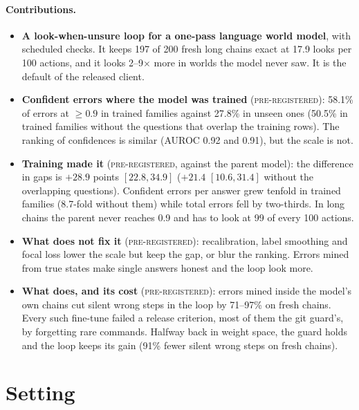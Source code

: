 \documentclass[11pt]{article}
\newcommand{\prereg}{\textsc{pre-registered}}
\begin{document}
\paragraph{Contributions.}
\begin{itemize}
  \item \textbf{A look-when-unsure loop for a one-pass language world model}, with scheduled checks. It keeps 197 of 200
  fresh long chains exact at 17.9 looks per 100 actions, and it looks 2--9$\times$ more in worlds the model never saw.
  It is the default of the released client.
  \item \textbf{Confident errors where the model was trained} (\prereg): 58.1\% of errors at $\ge 0.9$ in trained
  families against 27.8\% in unseen ones (50.5\% in trained families without the questions that overlap the training
  rows). The ranking of confidences is similar (AUROC 0.92 and 0.91), but the scale is not.
  \item \textbf{Training made it} (\prereg, against the parent model): the difference in gaps is $+28.9$ points
  $[22.8, 34.9]$ ($+21.4$ $[10.6, 31.4]$ without the overlapping questions). Confident errors per answer grew tenfold
  in trained families (8.7-fold without them) while total errors fell by two-thirds.
  In long chains the parent never reaches 0.9 and has to look at 99 of every 100 actions.
  \item \textbf{What does not fix it} (\prereg): recalibration, label smoothing and focal loss lower the scale but keep
  the gap, or blur the ranking. Errors mined from true states make single answers honest and the loop look more.
  \item \textbf{What does, and its cost} (\prereg): errors mined inside the model's own chains cut silent wrong steps
  in the loop by 71--97\% on fresh chains. Every such fine-tune failed a release criterion, most of them the git guard's,
  by forgetting rare commands. Halfway back in weight space, the guard holds and the loop keeps its gain (91\% fewer
  silent wrong steps on fresh chains).
\end{itemize}

\section{Setting}\label{sec:setting}
\end{document}
